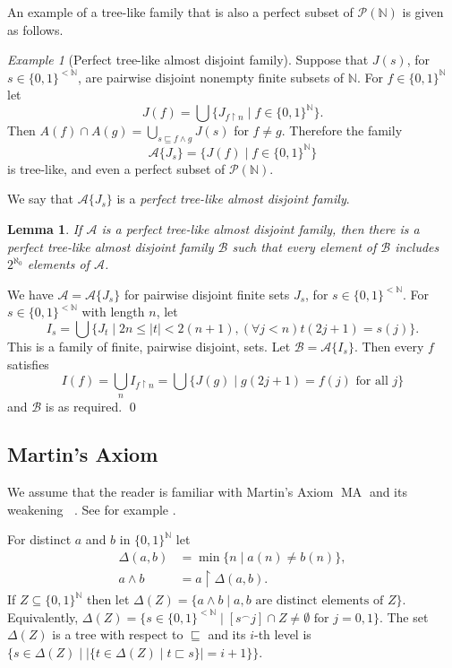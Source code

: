\documentclass{amsart}
\makeatletter
\def\N{\mathbb N}                        %
\def\rs{\restriction}
\def\text{\mbox}
\newtheorem{lemma}[proposition]{Lemma}
\theoremstyle{definition}
\theoremstyle{remark}
\newtheorem{example}[proposition]{Example}
\def\twolo{\{0,1\}^{<\N}}
\def\twoo{\{0,1\}^{\N}}
\renewcommand{\proofname}{Proof}
\renewenvironment{proof}[1][\proofname]{\par
\let\oldqedsymbol\qedsymbol             %
  \normalfont
  \topsep6\p@\@plus6\p@ \trivlist
  \item[\hskip\labelsep\hskip\parindent\scshape
    #1\@addpunct{.}]\ignorespaces
}{%
  \qed\endtrivlist
\global\let\qedsymbol\oldqedsymbol      %
}
\newcommand{\cP}{\mathcal P}
\newcommand{\bbN}{\mathbb N}
\newcommand{\cA}{\mathcal A}
\newcommand{\cB}{\mathcal B}
\DeclareMathOperator{\MA}{MA}
\DeclareMathOperator{\MAsigma}{MA(\sigma-\text{linked})}
\newcommand{\cPN}{\cP(\bbN)}
\numberwithin{claim}{subsection}
\makeatother
\begin{document}
An example of a tree-like family that is also a perfect subset of $\cPN$ is given as follows. 

\begin{example}[Perfect tree-like almost disjoint family] \label{ex.perfect} 
	Suppose that $J(s)$, for $s\in \twolo$, are pairwise disjoint nonempty finite subsets of $\bbN$. For $f\in \twoo$ let 
	\[
	J(f)=\bigcup\{J_{f\rs n}\mid f\in\twoo\}. 
	\]
	Then $A(f)\cap A(g)=\bigcup_{s\sqsubseteq f\wedge g} J(s)$ for $f\neq g$. Therefore the family 
	\[
\cA\{J_s\}=\{J(f)\mid f\in \twoo\}
	\]
	is  tree-like, and even a perfect subset of $\cPN$. 

We say that $\cA\{J_s\}$ is a \emph{perfect tree-like almost disjoint family}. 
\end{example}



\begin{lemma} \label{L.perfect.coarsening} If $\cA$ is a perfect tree-like almost disjoint family, then there is a perfect tree-like almost disjoint family $\cB$ such that every element of $\cB$ includes $2^{\aleph_0}$ elements of $\cA$. 
\end{lemma}

\begin{proof}
We have  $\cA=\cA\{J_s\}$ for pairwise disjoint finite sets $J_s$, for $s\in \twolo$. 
For $s\in \twolo$ with length $n$, let 
\[
I_s=\bigcup\{J_t\mid 2n \leq |t|<2(n+1), (\forall j< n) t(2j+1)=s(j)\}.
\]
This is a family of finite, pairwise disjoint, sets. 
Let $\cB=\cA\{I_s\}$. Then every $f$ satisfies
\[
I(f)=\bigcup_{n} I_{f\rs n}=\bigcup\{J(g)\mid g(2j+1)=f(j)\text{ for all }j\}
\]
and $\cB$ is as required. 
\end{proof}



\subsection{Martin's Axiom}\label{S.MA.ad}


We assume that the reader is familiar with Martin's Axiom $\MA$ and its weakening $\MAsigma$. See for example \cite{Ku:Set}. 



For distinct $a$ and $b$ in $\twoo$ let 
\begin{align*}
	\Delta(a,b)&=\min\{n\mid a(n)\neq b(n)\},\\
	a\wedge b&=a\rs \Delta(a,b). 
\end{align*}
If $Z\subseteq \twoo$ then let
\(
\Delta(Z)=\{a\wedge b\mid a,b\text{ are distinct elements of $Z$}\}. 
\)
Equivalently,  
$\Delta(Z)=\{s\in \twolo\mid [s^\frown j]\cap Z\neq \emptyset\text{ for }j=0,1\}$. 
The set $\Delta(Z)$ is a tree with respect to $\sqsubseteq$ and its $i$-th level is $\{s\in \Delta(Z)\mid |\{t\in \Delta(Z)\mid t\sqsubset s\}|=i+1\}\}$. 
\end{document}
